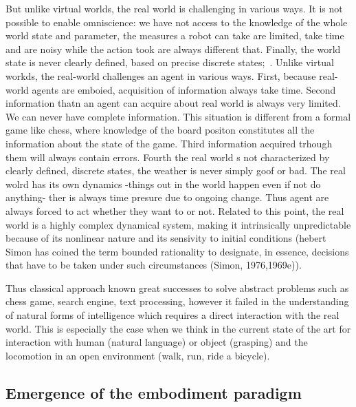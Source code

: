 \textcolor{TODO}{But unlike virtual worlds, the real world is challenging in various ways. It is not possible to enable omniscience: we have not access to the knowledge of the whole world state and parameter, the measures a robot can take are limited, take time and are noisy while the action took are always different that. Finally, the world state is never clearly defined, based on precise discrete states;~\cite{piefer06}.
Unlike virtual workds, the real-world challenges an agent in various ways. First, because real-world agents are emboied, acquisition of information always take time. Second information thatn an agent can acquire about real world is always very limited. We can never have complete information. This situation is different from a formal game like chess, where knowledge of the board positon constitutes all the information about the state of the game. Third information acquired trhough them will always contain errors. Fourth the real world s not characterized by clearly defined, discrete  states, the weather is never simply goof or bad.
The real wolrd has its own dynamics -things out in the world happen even if not do anything- ther is always time presure due to ongoing change. Thus agent are always forced to act whether they want to or not.
Related to this point, the real world is a highly complex dynamical system, making it intrinsically unpredictable because of its nonlinear nature and its sensivity to initial conditions (hebert Simon has coined the term bounded rationality to designate, in essence, decisions that have to be taken under such circumstances (Simon, 1976,1969e)).}

Thus classical approach known great successes to solve abstract problems such as chess game, search engine, text processing, however it failed in the understanding of natural forms of intelligence which requires a direct interaction with the real world. This is especially the case when we think in the current state of the art for interaction with human (natural language) or object (grasping) and the locomotion in an open environment (walk, run, ride a bicycle).

\subsection{Emergence of the embodiment paradigm} %

